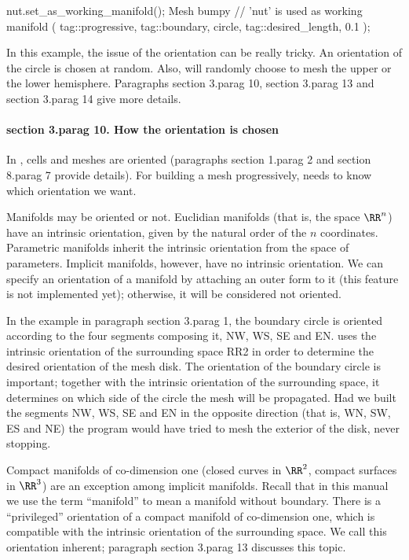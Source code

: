    nut.set_as_working_manifold();
   Mesh bumpy  // 'nut' is used as working manifold
      ( tag::progressive, tag::boundary, circle, tag::desired_length, 0.1 );
\endverbatim

In this example, the issue of the orientation can be really tricky.
An orientation of the {\codett circle} is chosen at random.
Also, {\maniFEM} will randomly choose to mesh the upper or the lower hemisphere.
Paragraphs \numb section 3.\numb parag 10, \numb section 3.\numb parag 13 and
\numb section 3.\numb parag 14 give more details.


\paragraph{\numb section 3.\numb parag 10. How the orientation is chosen}

In \maniFEM, cells and meshes are oriented (paragraphs \numb section 1.\numb parag 2
and \numb section 8.\numb parag 7 provide details).
For building a mesh progressively, {\maniFEM} needs to know which orientation we want.

Manifolds may be oriented or not.
Euclidian manifolds (that is, the space $ \RR^n $) have an intrinsic orientation, given by
the natural order of the $n$ coordinates.
Parametric manifolds inherit the intrinsic orientation from the space of parameters.
Implicit manifolds, however, have no intrinsic orientation.
We can specify an orientation of a manifold by attaching an outer form to it
(this feature is not implemented yet); otherwise, it will be considered not oriented.

In the example in paragraph \numb section 3.\numb parag 1, the boundary {\codett circle}
is oriented according to the four segments composing it, {\codett NW}, {\codett WS},
{\codett SE} and {\codett EN}.
{\ManiFEM} uses the intrinsic orientation of the surrounding space {\codett RR2} in order
to determine the desired orientation of the mesh {\codett disk}.
The orientation of the boundary {\codett circle} is important;
together with the intrinsic orientation of the surrounding space,
it determines on which side of the circle the mesh will be propagated.
Had we built the segments {\codett NW}, {\codett WS}, {\codett SE} and {\codett EN} in the
opposite direction (that is, {\codett WN}, {\codett SW}, {\codett ES} and {\codett NE})
the program would have tried to mesh the exterior of the disk, never stopping.

Compact manifolds of co-dimension one (closed curves in $ \RR^2 $,
compact surfaces in $ \RR^3 $) are an exception among implicit manifolds.
Recall that in this manual we use the term ``manifold'' to mean a manifold without boundary.
There is a ``privileged'' orientation of a compact manifold of co-dimension one,
which is compatible with the intrinsic orientation of the surrounding space.
We call this orientation {\codett inherent}; paragraph \numb section 3.\numb parag 13
discusses this topic.

